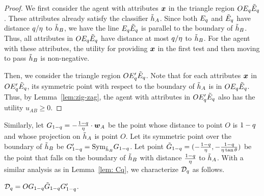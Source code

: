 \begin{proof}
    We first consider the agent with attributes $\boldsymbol{x}$ in the triangle region $OE_{q} \tilde {E}_{q}$. These attributes already satisfy the classifier $\tilde{h}_A$. Since both $E_{q}$ and $\tilde {E}_{q}$ have distance $q/\eta$ to $\tilde{h}_B$, we have the line $E_{q}\tilde {E}_{q}$ is parallel to the boundary of $\tilde{h}_B$. Thus, all attributes in $OE_{q} \tilde {E}_{q}$ have distance at most $q/\eta$ to $\tilde{h}_B$. For the agent with these attributes, the utility for providing $\boldsymbol{x}$ in the first test and then moving to pass $\tilde {h}_B$ is non-negative. 

    Then, we consider the triangle region $OE_{q}' \tilde {E}_{q}$. Note that for each attributes $\boldsymbol{x}$ in $OE_{q}' \tilde {E}_{q}$, its symmetric point with respect to the boundary of $\tilde{h}_A$ is in $OE_{q} \tilde {E}_{q}$. Thus, by Lemma~\ref{lem:zig-zag}, the agent with attributes in $OE_{q}' \tilde {E}_{q}$ also has the utility $u_{AB} \geq 0$.
\end{proof}

Similarly, let $G_{1-q} = -\frac{1-q}{\eta}\cdot \boldsymbol{w}_A$ be the point whose distance to point $O$ is $1-q$ and whose projection on $\tilde{h}_A$ is point $O$. 
Let its symmetric point over the boundary of $\tilde{h}_B$ be $G_{1-q}' = \boldsymbol{\text{Sym}}_{\tilde{h}_B} G_{1-q}$.
Let point $\tilde {G}_{1-q}  = (-\frac{ 1-q}{\eta},-\frac{1-q}{\eta\tan{\theta}})$ be the point that falls on the boundary of $\tilde{h}_B$ with distance $\frac{1-q}{\eta}$ to $\tilde{h}_A$. With a similar analysis as in Lemma~\ref{lem: Cq}, we characterize $\mathcal{D}_{q}$ as follows.

\begin{lemma}\label{lem: Dq}
    $\mathcal{D}_{q} = O G_{1-q} \tilde {G}_{1-q} G_{1-q}'$.
\end{lemma}

